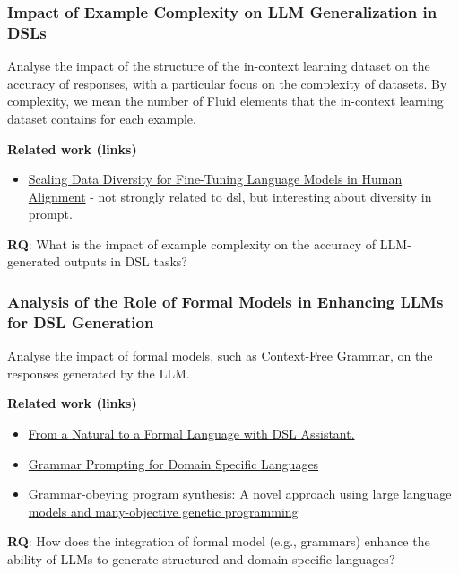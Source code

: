 \subsubsection{Impact of Example Complexity on LLM Generalization in DSLs}
Analyse the impact of the structure of the in-context learning dataset on the accuracy of responses, with a
particular focus on the complexity of datasets. By complexity, we mean the number of Fluid elements that the
in-context learning dataset contains for each example.

\textbf{Related work (links)}
\begin{itemize}
    \item \href{http://www.lrec-conf.org/proceedings/lrec-coling-2024/pdf/2024.main-1.1251.pdf}{Scaling Data Diversity for Fine-Tuning Language Models in Human Alignment} - not strongly related to dsl, but interesting about diversity in prompt.
\end{itemize}

\textbf{RQ}: What is the impact of example complexity on the accuracy of LLM-generated outputs in DSL tasks?

\subsubsection{Analysis of the Role of Formal Models in Enhancing LLMs for DSL Generation}

Analyse the impact of formal models, such as Context-Free Grammar, on the responses generated by the LLM.

\textbf{Related work (links)}
\begin{itemize}
    \item \href{https://dl.acm.org/doi/10.1145/3652620.3687811}{From a Natural to a Formal Language with DSL Assistant.}
    \item \href{https://proceedings.neurips.cc/paper_files/paper/2023/file/cd40d0d65bfebb894ccc9ea822b47fa8-Paper-Conference.pdf}{Grammar Prompting for Domain Specific Languages}
    \item \href{https://www.sciencedirect.com/science/article/abs/pii/S0920548924001077}{Grammar-obeying program synthesis: A novel approach using large language models and many-objective genetic programming}
\end{itemize}

\textbf{RQ}: How does the integration of formal model (e.g., grammars) enhance the ability of LLMs to generate structured and domain-specific languages?

